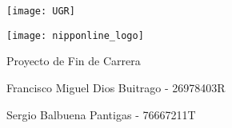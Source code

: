 \begin{center}
\texttt{[image: UGR]}

\vspace{2em}

\texttt{[image: nipponline\_logo]}

{\LARGE\Nipponline{}}

{\large{}Proyecto de Fin de Carrera}


\end{center}

\vspace{14em}
\hfill Francisco Miguel Dios Buitrago - 26978403R

\hfill Sergio Balbuena Pantigas - 76667211T

\thispagestyle{empty}